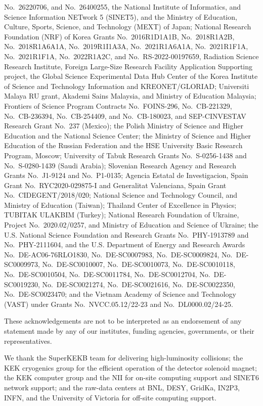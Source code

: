No.~26220706,
and
No.~26400255,
the National Institute of Informatics, and Science Information NETwork 5 (SINET5), 
and
the Ministry of Education, Culture, Sports, Science, and Technology (MEXT) of Japan;  
National Research Foundation (NRF) of Korea Grants
No.~2016R1\-D1A1B,
No.~2018R1\-A2B,
No.~2018R1\-A6A1A,
No.~2019R1\-I1A3A,
No.~2021R1\-A6A1A,
No.~2021R1\-F1A,
No.~2021R1\-F1A,
No.~2022R1\-A2C,
and
No.~RS-2022-00197659,
Radiation Science Research Institute,
Foreign Large-Size Research Facility Application Supporting project,
the Global Science Experimental Data Hub Center of the Korea Institute of Science and Technology Information
and
KREONET/GLORIAD;
Universiti Malaya RU grant, Akademi Sains Malaysia, and Ministry of Education Malaysia;
Frontiers of Science Program Contracts
No.~FOINS-296,
No.~CB-221329,
No.~CB-236394,
No.~CB-254409,
and
No.~CB-180023, and SEP-CINVESTAV Research Grant No.~237 (Mexico);
the Polish Ministry of Science and Higher Education and the National Science Center;
the Ministry of Science and Higher Education of the Russian Federation
and
the HSE University Basic Research Program, Moscow;
University of Tabuk Research Grants
No.~S-0256-1438 and No.~S-0280-1439 (Saudi Arabia);
Slovenian Research Agency and Research Grants
No.~J1-9124
and
No.~P1-0135;
Agencia Estatal de Investigacion, Spain
Grant No.~RYC2020-029875-I
and
Generalitat Valenciana, Spain
Grant No.~CIDEGENT/2018/020;
National Science and Technology Council,
and
Ministry of Education (Taiwan);
Thailand Center of Excellence in Physics;
TUBITAK ULAKBIM (Turkey);
National Research Foundation of Ukraine, Project No.~2020.02/0257,
and
Ministry of Education and Science of Ukraine;
the U.S. National Science Foundation and Research Grants
No.~PHY-1913789 %
and
No.~PHY-2111604, %
and the U.S. Department of Energy and Research Awards
No.~DE-AC06-76RLO1830, %
No.~DE-SC0007983, %
No.~DE-SC0009824, %
No.~DE-SC0009973, %
No.~DE-SC0010007, %
No.~DE-SC0010073, %
No.~DE-SC0010118, %
No.~DE-SC0010504, %
No.~DE-SC0011784, %
No.~DE-SC0012704, %
No.~DE-SC0019230, %
No.~DE-SC0021274, %
No.~DE-SC0021616, %
No.~DE-SC0022350, %
No.~DE-SC0023470; %
and
the Vietnam Academy of Science and Technology (VAST) under Grants
No.~NVCC.05.12/22-23
and
No.~DL0000.02/24-25.

These acknowledgements are not to be interpreted as an endorsement of any statement made
by any of our institutes, funding agencies, governments, or their representatives.

We thank the SuperKEKB team for delivering high-luminosity collisions;
the KEK cryogenics group for the efficient operation of the detector solenoid magnet;
the KEK computer group and the NII for on-site computing support and SINET6 network support;
and the raw-data centers at BNL, DESY, GridKa, IN2P3, INFN, and the University of Victoria for off-site computing support.
